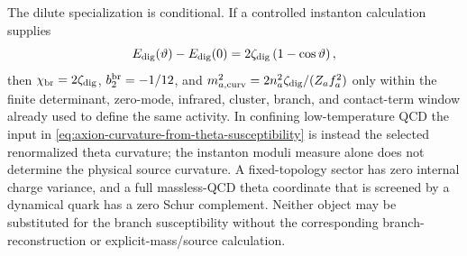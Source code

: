 \begin{controlledapproximation}
The dilute specialization is conditional.  If a controlled instanton
calculation supplies
\begin{equation}
  E_{\rm dig}(\vartheta)-E_{\rm dig}(0)
  =
  2\zeta_{\rm dig}\left(1-\cos\vartheta\right),
  \label{eq:dilute-gas-axion-source-potential}
\end{equation}
then \(\chi_{\rm br}=2\zeta_{\rm dig}\), \(b_2^{\rm br}=-1/12\), and
\(m_{a,{\rm curv}}^2=2n_a^2\zeta_{\rm dig}/(Z_af_a^2)\) only within the
finite determinant, zero-mode, infrared, cluster, branch, and contact-term
window already used to define the same activity.  In confining low-temperature
QCD the input in \eqref{eq:axion-curvature-from-theta-susceptibility} is instead
the selected renormalized theta curvature; the instanton moduli measure alone
does not determine the physical source curvature.  A fixed-topology sector has
zero internal charge variance, and a full massless-QCD theta coordinate that is
screened by a dynamical quark has a zero Schur complement.  Neither object may
be substituted for the branch susceptibility without the corresponding
branch-reconstruction or explicit-mass/source calculation.
\end{controlledapproximation}

